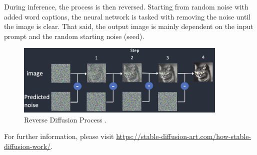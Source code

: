\documentclass[
  a4paper,  %
  twoside,  %
  bibliography=totoc,
  headsepline,
  cleardoublepage=empty,
  parskip=half,
  draft=false
]{scrbook}
\begin{document}
During inference, the process is then reversed. Starting from random noise with added word captions, the neural network is tasked with removing the noise until the image is clear. That said, the output image is mainly dependent on the input prompt and the random starting noise (seed).

\begin{figure}[h]
  \centering
  \includegraphics[width=0.9\textwidth]{./graphics/reverse-diff.png}
  \caption{Reverse Diffusion Process \cite{andrewHowDoesStable2022}.}
  \label{fig:backward-diff}
\end{figure}

For further information, please visit \url{https://stable-diffusion-art.com/how-stable-diffusion-work/}.

% 

\pagestyle{empty}
\renewcommand*{\chapterpagestyle}{empty}
\Affirmation
\end{document}
